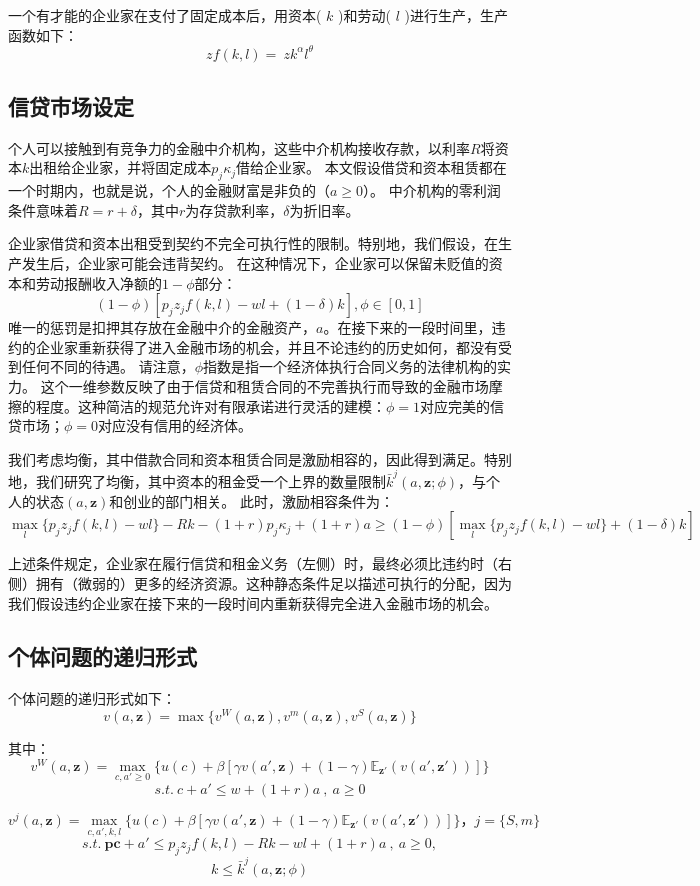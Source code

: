 \documentclass[a4paper, 12pt]{ctexart}
\begin{document}
一个有才能的企业家在支付了固定成本后，用资本( $k$ )和劳动( $l$ )进行生产，生产函数如下：
$$zf(k,l)=\ zk^{\alpha}l^{\theta}$$
\subsection{信贷市场设定}
个人可以接触到有竞争力的金融中介机构，这些中介机构接收存款，以利率$R$将资本$k$出租给企业家，并将固定成本$p_j \kappa_j$借给企业家。
本文假设借贷和资本租赁都在一个时期内，也就是说，个人的金融财富是非负的（$a\geq 0$）。
中介机构的零利润条件意味着$R = r + \delta$，其中$r$为存贷款利率，$\delta$为折旧率。

企业家借贷和资本出租受到契约不完全可执行性的限制。特别地，我们假设，在生产发生后，企业家可能会违背契约。
在这种情况下，企业家可以保留未贬值的资本和劳动报酬收入净额的$1 - \phi$部分：
$$(1-\phi)[p_jz_jf(k,l)-wl+(1-\delta)k],\phi \in [0,1]$$
唯一的惩罚是扣押其存放在金融中介的金融资产，$a$。在接下来的一段时间里，违约的企业家重新获得了进入金融市场的机会，并且不论违约的历史如何，都没有受到任何不同的待遇。
请注意，$\phi$指数是指一个经济体执行合同义务的法律机构的实力。
这个一维参数反映了由于信贷和租赁合同的不完善执行而导致的金融市场摩擦的程度。这种简洁的规范允许对有限承诺进行灵活的建模：$\phi=1$对应完美的信贷市场；$\phi=0$对应没有信用的经济体。

我们考虑均衡，其中借款合同和资本租赁合同是激励相容的，因此得到满足。特别地，我们研究了均衡，其中资本的租金受一个上界的数量限制$\bar{k}^j(a,\mathbf{z};\phi)$，与个人的状态$(a,\mathbf{z})$和创业的部门相关。
此时，激励相容条件为：
$$\max_l \{ p_jz_jf(k,l)-wl \} -Rk-(1+r)p_j \kappa_j+(1+r)a \geq (1-\phi)[\max_l \{ p_jz_jf(k,l)-wl \}+(1-\delta)k]$$

上述条件规定，企业家在履行信贷和租金义务（左侧）时，最终必须比违约时（右侧）拥有（微弱的）更多的经济资源。这种静态条件足以描述可执行的分配，因为我们假设违约企业家在接下来的一段时间内重新获得完全进入金融市场的机会。
\subsection{个体问题的递归形式}
个体问题的递归形式如下：
$$
v(a,\mathbf{z})=\max\{v^W(a,\mathbf{z}),v^m(a,\mathbf{z}),v^S(a,\mathbf{z})\}
$$

其中：
$$
v^W(a,\mathbf{z}) = \max_{c,a' \geq 0} \{u(c) + \beta[\gamma v(a',\mathbf{z}) + (1-\gamma)\mathbb E_{\mathbf{z}'}(v(a',\mathbf{z}'))]\}
$$
$$
s.t. \ c+a'\leq w+(1+r)a \ ,\ a\geq 0
$$

$$
v^j(a,\mathbf{z}) = \max_{c,a',k,l} \{u(c) + \beta[\gamma v(a',\mathbf{z}) + (1-\gamma)\mathbb E_{\mathbf{z}'}(v(a',\mathbf{z}'))]\}，j=\{S,m\}
$$
$$
s.t. \ \mathbf{pc}+a'\leq p_jz_jf(k,l)-Rk-wl+(1+r)a \ ,\ a\geq 0,
$$
$$k \leq \bar{k}^j(a,\mathbf{z};\phi)$$
\end{document}
